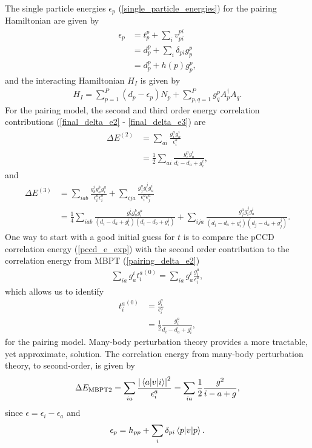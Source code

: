 \documentclass[10pt]{article}
\begin{document}
The single particle energies $\epsilon_p$ (\ref{single_particle_energies}) for the pairing Hamiltonian are given by
\begin{align}
\epsilon_p 
&=
t^p_p+\sum_iv^{pi}_{pi}
\\
&=
d^p_p
+
\sum_{i}\delta_{pi}g^p_p
\\
&=
d^p_p
+
h(p)g^p_p
,\end{align}
and the interacting Hamiltonian $H_I$ is given by
\begin{align}
H_I
=
\sum_{p=1}^P(d_p-\epsilon_p)N_p+\sum_{p,q=1}^Pg^p_qA^\dagger_p A_q.
\end{align}
For the pairing model, the second and third order energy correlation contributions (\ref{final_delta_e2} - \ref{final_delta_e3}) are
\begin{align}
\label{pairing_delta_e2}
\Delta E^{(2)}
&=
\sum_{ai}\frac{g^a_ig^i_a}{\epsilon^{a}_{i}}
\nonumber
\\
&=
\frac{1}{2}\sum_{ai}\frac{g^a_ig^i_a}{d_i-d_a+g^i_i}
,\end{align}
and
\begin{align}
\label{pairing_delta_e3}
\Delta E^{(3)}
&=
\sum_{iab}
\frac{g^{i}_{b}g^{b}_{a}g^{a}_{i}}{\epsilon^{a}_{i}\epsilon^{b}_{i}}
+
\sum_{ija}
\frac{g^{a}_{j}g^{j}_{i}g^{i}_{a}}{\epsilon^{a}_{i}\epsilon^{a}_{j}}
\nonumber
\\
&=
\frac{1}{4}\sum_{iab}
\frac{g^{i}_{b}g^{b}_{a}g^{a}_{i}}{\left(d_i-d_a+g^i_i\right)\left(d_i-d_b+g^i_i\right)}
+
\sum_{ija}
\frac{g^{a}_{j}g^{j}_{i}g^{i}_{a}}{\left(d_i-d_a+g^i_i\right)\left(d_j-d_a+g^j_j\right)}
.\end{align}
One way to start with a good initial guess for $t$ is to compare the pCCD correlation energy (\ref{pccd_e_exp}) with the second order contribution to the correlation energy from MBPT (\ref{pairing_delta_e2})
\begin{align}
\sum_{ia}g^i_a{t^a_i}^{(0)}=\sum_{ia}g^i_a\frac{g^a_i}{\epsilon^{a}_{i}}
,\end{align}
which allows us to identify
\begin{align}
\label{t_init}
{t^a_i}^{(0)}
&=
\frac{g^a_i}{\epsilon^{a}_{i}}
\nonumber
\\
&=
\frac{1}{2}\frac{g^a_i}{d_i-d_a+g^i_i}
,\end{align}
for the pairing model. Many-body perturbation theory provides a more tractable, yet approximate, solution. The correlation energy from many-body perturbation theory, to second-order, is given by
\begin{align}
\Delta E_{\text{MBPT}2}
=
\sum_{ia}\frac{\abs{\mel{a}{v}{i}}^2}{\epsilon^a_i}
=\sum_{ia}\frac{1}{2}\frac{g^2}{i-a+g}
,\end{align}
since $\epsilon= \epsilon_i-\epsilon_a$ and
\begin{align}
\epsilon_p= h_{pp}+\sum_i\delta_{pi}\mel{p}{v}{p}
.\end{align}
\end{document}
